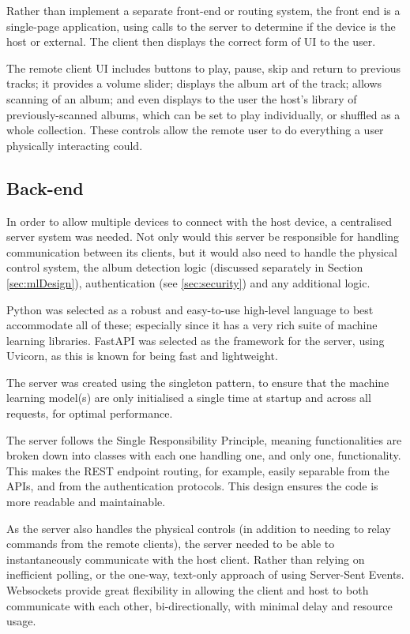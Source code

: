                Rather than implement a separate front-end or routing system, the front end is a single-page application, using calls to the server to determine if the device is the host or external. The client then displays the correct form of UI to the user.
    
                The remote client UI includes buttons to play, pause, skip and return to previous tracks; it provides a volume slider; displays the album art of the track; allows scanning of an album; and even displays to the user the host's library of previously-scanned albums, which can be set to play individually, or shuffled as a whole collection. These controls allow the remote user to do everything a user physically interacting could.
        
        \subsection{Back-end}
    
            In order to allow multiple devices to connect with the host device, a centralised server system was needed. Not only would this server be responsible for handling communication between its clients, but it would also need to handle the physical control system, the album detection logic (discussed separately in Section \ref{sec:mlDesign}), authentication (see \ref{sec:security}) and any additional logic.
    
            Python was selected as a robust and easy-to-use high-level language to best accommodate all of these; especially since it has a very rich suite of machine learning libraries. FastAPI was selected as the framework for the server, using Uvicorn, as this is known for being fast and lightweight.
    
            The server was created using the singleton pattern, to ensure that the machine learning model(s) are only initialised a single time at startup and across all requests, for optimal performance.
    
            The server follows the Single Responsibility Principle, meaning functionalities are broken down into classes with each one handling one, and only one, functionality. This makes the REST endpoint routing, for example, easily separable from the APIs, and from the authentication protocols. This design ensures the code is more readable and maintainable.
    
            As the server also handles the physical controls (in addition to needing to relay commands from the remote clients), the server needed to be able to instantaneously communicate with the host client. Rather than relying on inefficient polling, or the one-way, text-only approach of using Server-Sent Events. Websockets provide great flexibility in allowing the client and host to both communicate with each other, bi-directionally, with minimal delay and resource usage.
        
